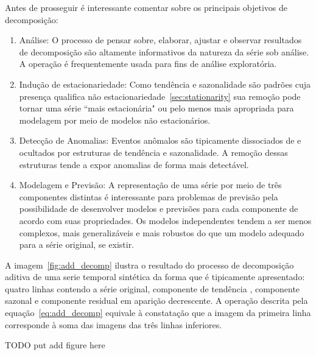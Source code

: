 Antes de prosseguir é interessante comentar sobre os principais objetivos de
decomposição:

\begin{enumerate}

    \item Análise: O processo de pensar sobre, elaborar, ajustar e observar
    resultados de decomposição são altamente informativos da natureza da
    série sob análise. A operação é frequentemente usada para fins de análise
    exploratória.

    \item Indução de estacionariedade: Como tendência e sazonalidade são
    padrões cuja presença qualifica não estacionariedade~\ref{sec:stationarity}
    sua remoção pode tornar uma série ``mais estacionária" ou pelo menos mais
    apropriada para modelagem por meio de modelos não estacionários.

    \item Detecção de Anomalias: Eventos anômalos são tipicamente dissociados
    de e ocultados por estruturas de tendência e sazonalidade. A remoção
    dessas estruturas tende a expor anomalias de forma mais detectável.

    \item Modelagem e Previsão: A representação de uma série por meio de três
    componentes distintas é interessante para problemas de previsão pela
    possibilidade de desenvolver modelos e previsões para cada componente de
    acordo com suas propriedades. Os modelos independentes tendem a ser menos
    complexos, mais generalizáveis e mais robustos do que um modelo adequado
    para a série original, se existir.

\end{enumerate}

A imagem~\ref{fig:add_decomp} ilustra o resultado do processo de
decomposição aditiva de uma serie temporal sintética da forma que é tipicamente
apresentado: quatro linhas contendo a série original, componente de tendência ,
componente sazonal e componente residual em aparição decrescente. A operação
descrita pela equação~\ref{eq:add_decomp} equivale à constatação que a
imagem da primeira linha corresponde à soma das imagens das três linhas
inferiores.

TODO put add figure here


